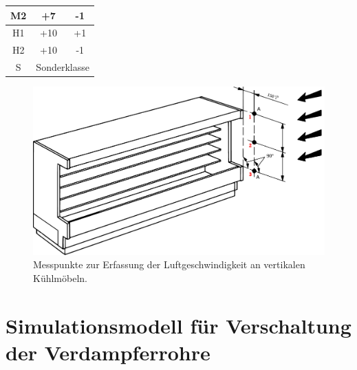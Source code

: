 \begin{table}[h!]
\begin{tabular}{|c|c|c|}
M2              & +7                                                                                                                         & -1                                                                                                                         \\ \hline
H1              & +10                                                                                                                        & +1                                                                                                                         \\ \hline
H2              & +10                                                                                                                        & -1                                                                                                                         \\ \hline
S               & \multicolumn{2}{c|}{Sonderklasse}                                                                                                                                                                                                                       \\ \hline
\end{tabular}
\end{table}




\begin{figure}[h!tb]
\centering
\includegraphics[scale=.5]{Pictures/idc_meas2.pdf}
\caption{Messpunkte zur Erfassung der Luftgeschwindigkeit an vertikalen Kühlmöbeln.}
\label{fig:Messpunkte}
\end{figure}

\clearpage

\section{Simulationsmodell für Verschaltung der Verdampferrohre}
\label{sec:Simulationsmodell}

